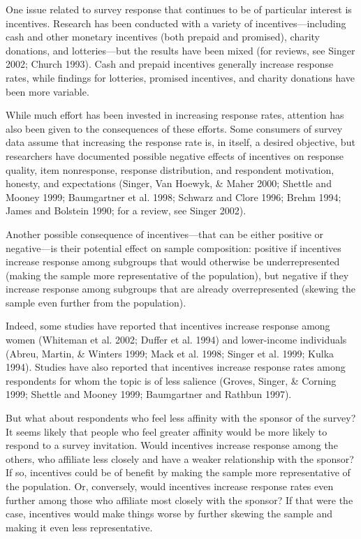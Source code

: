 \documentclass[12pt]{article}
\begin{document}
One issue related to survey response that continues to be of particular interest is incentives. Research has been conducted with a variety of incentives—including cash and other monetary incentives (both prepaid and promised), charity donations, and lotteries—but the results have been mixed (for reviews, see Singer 2002; Church 1993). Cash and prepaid incentives generally increase response rates, while findings for lotteries, promised incentives, and charity donations have been more variable.

While much effort has been invested in increasing response rates, attention has also been given to the consequences of these efforts. Some consumers of survey data assume that increasing the response rate is, in itself, a desired objective, but researchers have documented possible negative effects of incentives on response quality, item nonresponse, response distribution, and respondent motivation, honesty, and expectations (Singer, Van Hoewyk, \& Maher 2000; Shettle and Mooney 1999; Baumgartner et al. 1998; Schwarz and Clore 1996; Brehm 1994; James and Bolstein 1990; for a review, see Singer 2002).

Another possible consequence of incentives—that can be either positive or negative—is their potential effect on sample composition: positive if incentives increase response among subgroups that would otherwise be underrepresented (making the sample more representative of the population), but negative if they increase response among subgroups that are already overrepresented (skewing the sample even further from the population).

Indeed, some studies have reported that incentives increase response among women (Whiteman et al. 2002; Duffer et al. 1994) and lower-income individuals (Abreu, Martin, \& Winters 1999; Mack et al. 1998; Singer et al. 1999; Kulka 1994). Studies have also reported that incentives increase response rates among respondents for whom the topic is of less salience (Groves, Singer, \& Corning 1999; Shettle and Mooney 1999; Baumgartner and Rathbun 1997).

But what about respondents who feel less affinity with the sponsor of the survey? It seems likely that people who feel greater affinity would be more likely to respond to a survey invitation. Would incentives increase response among the others, who affiliate less closely and have a weaker relationship with the sponsor? If so, incentives could be of benefit by making the sample more representative of the population. Or, conversely, would incentives increase response rates even further among those who affiliate most closely with the sponsor? If that were the case, incentives would make things worse by further skewing the sample and making it even less representative.
\end{document}
